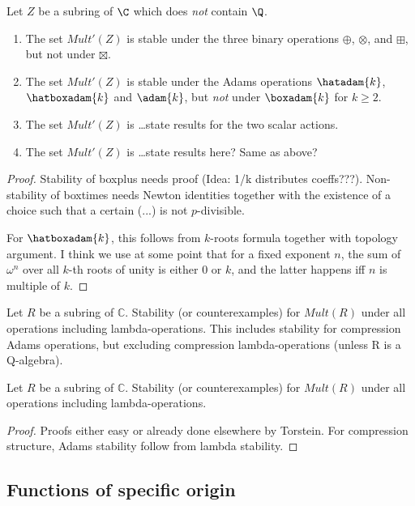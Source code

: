 \documentclass[a4paper]{article}
\begin{document}
\begin{theorem}
Let $Z$ be a subring of $\C$ which does \emph{not} contain $\Q$.
\begin{enumerate}
\item The set $Mult'(Z)$ is stable under the three binary operations $\oplus$, $\otimes$, and $\boxplus$, but not under $\boxtimes$.
\item The set $Mult'(Z)$ is stable under the Adams operations $\hatadam{k}$, $\hatboxadam{k}$ and $\adam{k}$, but \emph{not} under $\boxadam{k}$ for $k \geq 2$. 
\item The set $Mult'(Z)$ is \ldots state results for the two scalar actions.
\item The set $Mult'(Z)$ is \ldots state results here? Same as above?
\end{enumerate}
\end{theorem}

\begin{proof}
Stability of boxplus needs proof (Idea: 1/k distributes coeffs???). Non-stability of boxtimes needs Newton identities together with the existence of a choice such that a certain (...) is not $p$-divisible.

For $\hatboxadam{k}$, this follows from $k$-roots formula together with topology argument. I think we use at some point that for a fixed exponent $n$, the sum of $\omega^n$ over all $k$-th roots of unity is either 0 or $k$, and the latter happens iff $n$ is multiple of $k$. 
\end{proof}


\begin{theorem}
Let $R$ be a subring of $\mathbb{C}$. Stability (or counterexamples) for $Mult(R)$ under all operations including lambda-operations. This includes stability for compression Adams operations, but excluding compression lambda-operations (unless R is a Q-algebra).
\end{theorem}



\begin{theorem}
Let $R$ be a subring of $\mathbb{C}$. Stability (or counterexamples) for $Mult(R)$ under all operations including lambda-operations.
\end{theorem}
\begin{proof}
Proofs either easy or already done elsewhere by Torstein. For compression structure, Adams stability follow from lambda stability.
\end{proof}


\subsection{Functions of specific origin}
\end{document}
